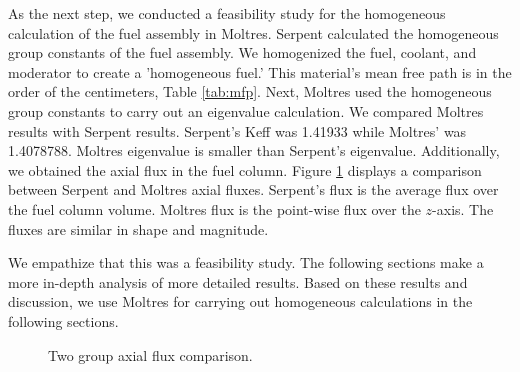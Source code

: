 As the next step, we conducted a feasibility study for the homogeneous calculation of the fuel assembly in Moltres.
Serpent calculated the homogeneous group constants of the fuel assembly.
We homogenized the fuel, coolant, and moderator to create a 'homogeneous fuel.'
This material's mean free path is in the order of the centimeters, Table \ref{tab:mfp}.
Next, Moltres used the homogeneous group constants to carry out an eigenvalue calculation.
We compared Moltres results with Serpent results.
Serpent's \gls{Keff} was 1.41933 while Moltres' was 1.4078788.
Moltres eigenvalue is smaller than Serpent's eigenvalue.
Additionally, we obtained the axial flux in the fuel column.
Figure \ref{fig:prelim} displays a comparison between Serpent and Moltres axial fluxes.
Serpent's flux is the average flux over the fuel column volume.
Moltres flux is the point-wise flux over the $z$-axis.
The fluxes are similar in shape and magnitude.

We empathize that this was a feasibility study.
The following sections make a more in-depth analysis of more detailed results.
Based on these results and discussion, we use Moltres for carrying out homogeneous calculations in the following sections.

\begin{figure}[htbp!]
	\centering
	\hfill
  \caption{Two group axial flux comparison.}
	\label{fig:prelim}
\end{figure}

